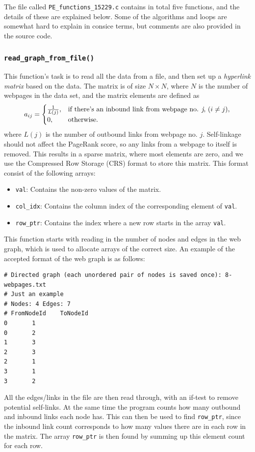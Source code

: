 \documentclass[10pt, a4paper]{amsart}
\numberwithin{figure}{section}
\numberwithin{table}{section}
\begin{document}
The file called \texttt{PE\_functions\_15229.c} contains in total five functions, and the details of these are explained below. Some of the algorithms and loops are somewhat hard to explain in consice terms, but comments are also provided in the source code.

\subsubsection{\texttt{read\_graph\_from\_file()}}
This function's task is to read all the data from a file, and then set up a \textit{hyperlink matrix} based on the data. The matrix is of size $N \times N$, where $N$ is the number of webpages in the data set, and the matrix elements are defined as
\begin{equation}
    a_{ij} =
    \begin{cases}
            \frac{1}{L(j)}, &         \text{if there's an inbound link from webpage no. \textit{j}, } (i\neq j),\\
            0, &         \text{otherwise}.
    \end{cases}
\end{equation}
where $L(j)$ is the number of outbound links from webpage no. $j$. Self-linkage should not affect the PageRank score, so any links from a webpage to itself is removed. This results in a sparse matrix, where most elements are zero, and we use the Compressed Row Storage (CRS) format to store this matrix. This format consist of the following arrays:
\begin{itemize}
    \item \texttt{val}: Contains the non-zero values of the matrix.
    \item \texttt{col\_idx}: Contains the column index of the corresponding element of \texttt{val}.
    \item \texttt{row\_ptr}: Contains the index where a new row starts in the array \texttt{val}.
\end{itemize}

This function starts with reading in the number of nodes and edges in the web graph, which is used to allocate arrays of the correct size. An example of the accepted format of the web graph is as follows:
\begin{verbatim}
# Directed graph (each unordered pair of nodes is saved once): 8-webpages.txt
# Just an example
# Nodes: 4 Edges: 7
# FromNodeId    ToNodeId
0       1
0       2
1       3
2       3
2       1
3       1
3       2

\end{verbatim}
All the edges/links in the file are then read through, with an if-test to remove potential self-links. At the same time the program counts how many outbound and inbound links each node has. This can then be used to find \texttt{row\_ptr}, since the inbound link count corresponds to how many values there are in each row in the matrix. The array \texttt{row\_ptr} is then found  by summing up this element count for each row.
\end{document}
